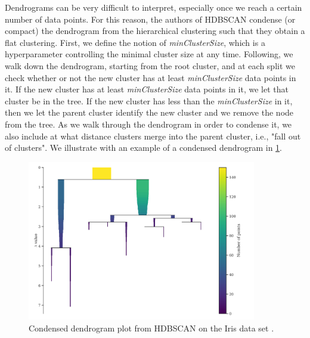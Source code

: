 Dendrograms can be very difficult to interpret, especially once we reach a certain number of data points. For this reason, the authors of HDBSCAN condense (or compact) the dendrogram from the hierarchical clustering such that they obtain a flat clustering. First, we define the notion of \textit{minClusterSize}, which is a hyperparameter controlling the minimal cluster size at any time. Following, we walk down the dendrogram, starting from the root cluster, and at each split we check whether or not the new cluster has at least \textit{minClusterSize} data points in it. If the new cluster has at least \textit{minClusterSize} data points in it, we let that cluster be in the tree. If the new cluster has less than the \textit{minClusterSize} in it, then we let the parent cluster identify the new cluster and we remove the node from the tree. As we walk through the dendrogram in order to condense it, we also include at what distance clusters merge into the parent cluster, i.e., "fall out of clusters". We illustrate with an example of a condensed dendrogram in \cref{fig:hdbscan-condensed-dendrogram-example}.
\begin{figure}[H]
    \centering
    \includegraphics[width=10cm]{thesis/figures/hdbscan-condensed-tree-example.pdf}
    \caption{Condensed dendrogram plot from HDBSCAN on the Iris data set \cite{Fisher1936}.}
    \label{fig:hdbscan-condensed-dendrogram-example}
\end{figure}

